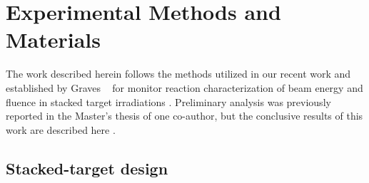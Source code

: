 \section{\label{sec:experimental_fe}Experimental Methods and Materials}


The work described herein follows the  methods utilized in our recent work and established by Graves \etal\ 
for monitor reaction characterization of beam energy and fluence in stacked target irradiations \cite{Voyles2018a,Graves2016}.
% 
% 
% 
Preliminary analysis  was previously reported in the Master's thesis of one co-author, but the conclusive results of this work are described here  \cite{springer2017investigation}.



\subsection{\label{sec:target_design_fe}Stacked-target design}


